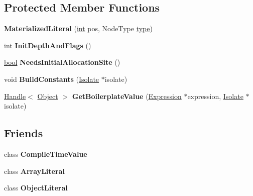 \subsection*{Protected Member Functions}
\begin{DoxyCompactItemize}
\item 
\mbox{\label{classv8_1_1internal_1_1MaterializedLiteral_ae8799ae47645d7451478328e748a2fac}} 
{\bfseries Materialized\+Literal} (\mbox{\hyperlink{classint}{int}} pos, Node\+Type \mbox{\hyperlink{classstd_1_1conditional_1_1type}{type}})
\item 
\mbox{\label{classv8_1_1internal_1_1MaterializedLiteral_ab3871e7bac454a501c0ec8eaf4a74b4f}} 
\mbox{\hyperlink{classint}{int}} {\bfseries Init\+Depth\+And\+Flags} ()
\item 
\mbox{\label{classv8_1_1internal_1_1MaterializedLiteral_a6acefdfa74a743dafe84df3122a02979}} 
\mbox{\hyperlink{classbool}{bool}} {\bfseries Needs\+Initial\+Allocation\+Site} ()
\item 
\mbox{\label{classv8_1_1internal_1_1MaterializedLiteral_a8aa06fd94266a295ae6628925fea436d}} 
void {\bfseries Build\+Constants} (\mbox{\hyperlink{classv8_1_1internal_1_1Isolate}{Isolate}} $\ast$isolate)
\item 
\mbox{\label{classv8_1_1internal_1_1MaterializedLiteral_a3f2e9681f5506407af5bf2c23e142bbd}} 
\mbox{\hyperlink{classv8_1_1internal_1_1Handle}{Handle}}$<$ \mbox{\hyperlink{classv8_1_1internal_1_1Object}{Object}} $>$ {\bfseries Get\+Boilerplate\+Value} (\mbox{\hyperlink{classv8_1_1internal_1_1Expression}{Expression}} $\ast$expression, \mbox{\hyperlink{classv8_1_1internal_1_1Isolate}{Isolate}} $\ast$isolate)
\end{DoxyCompactItemize}
\subsection*{Friends}
\begin{DoxyCompactItemize}
\item 
\mbox{\label{classv8_1_1internal_1_1MaterializedLiteral_a8b5ce5782a366f51fd3ac3a2a7bbc54f}} 
class {\bfseries Compile\+Time\+Value}
\item 
\mbox{\label{classv8_1_1internal_1_1MaterializedLiteral_a13d34cc74ec8e17e3891f53066cbcd4e}} 
class {\bfseries Array\+Literal}
\item 
\mbox{\label{classv8_1_1internal_1_1MaterializedLiteral_af53f5f0c57f02b72b3211be078d03c7d}} 
class {\bfseries Object\+Literal}
\end{DoxyCompactItemize}
